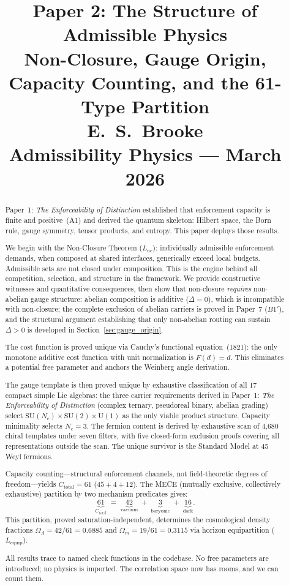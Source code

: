 \documentclass[11pt]{article}
\title{
  \textbf{Paper 2: The Structure of Admissible Physics}\\
  \large Non-Closure, Gauge Origin, Capacity Counting, and the 61-Type Partition\\
  \normalsize E.\ S.\ Brooke\\
  Admissibility Physics --- March 2026
}
\author{}
\date{}
\newcommand{\SU}{\mathrm{SU}}
\newcommand{\U}{\mathrm{U}}
\begin{document}
\maketitle

\begin{abstract}
\noindent
Paper~1: \emph{The Enforceability of Distinction} established that enforcement capacity is finite and positive~(A1) and derived the quantum skeleton: Hilbert space, the Born rule, gauge symmetry, tensor products, and entropy.  This paper deploys those results.

We begin with the Non-Closure Theorem ($L_{\mathrm{nc}}$): individually admissible enforcement demands, when composed at shared interfaces, generically exceed local budgets.  Admissible sets are not closed under composition.  This is the engine behind all competition, selection, and structure in the framework.  We provide constructive witnesses and quantitative consequences, then show that non-closure \emph{requires} non-abelian gauge structure: abelian composition is additive ($\Delta = 0$), which is incompatible with non-closure; the complete exclusion of abelian carriers is proved in Paper~7 ($B1'$), and the structural argument establishing that only non-abelian routing can sustain $\Delta > 0$ is developed in Section~\ref{sec:gauge_origin}.

The cost function is proved unique via Cauchy's functional equation~(1821): the only monotone additive cost function with unit normalization is $F(d) = d$.  This eliminates a potential free parameter and anchors the Weinberg angle derivation.

The gauge template is then proved unique by exhaustive classification of all 17 compact simple Lie algebras: the three carrier requirements derived in Paper~1: \emph{The Enforceability of Distinction} (complex ternary, pseudoreal binary, abelian grading) select $\SU(N_c) \times \SU(2) \times \U(1)$ as the only viable product structure.  Capacity minimality selects $N_c = 3$.  The fermion content is derived by exhaustive scan of 4{,}680 chiral templates under seven filters, with five closed-form exclusion proofs covering all representations outside the scan.  The unique survivor is the Standard Model at 45 Weyl fermions.

Capacity counting---structural enforcement channels, not field-theoretic degrees of freedom---yields $C_{\mathrm{total}} = 61$ ($45 + 4 + 12$).  The MECE (mutually exclusive, collectively exhaustive) partition by two mechanism predicates gives:
\begin{equation}
\underbrace{61}_{C_{\mathrm{total}}} \;=\; \underbrace{42}_{\text{vacuum}} \;+\; \underbrace{3}_{\text{baryonic}} \;+\; \underbrace{16}_{\text{dark}}.
\label{eq:mece_abstract}
\end{equation}
This partition, proved saturation-independent, determines the cosmological density fractions $\Omega_\Lambda = 42/61 = 0.6885$ and $\Omega_m = 19/61 = 0.3115$ via horizon equipartition ($L_{\mathrm{equip}}$).

All results trace to named check functions in the codebase.  No free parameters are introduced; no physics is imported.  The correlation space now has rooms, and we can count them.
\end{abstract}
\end{document}
